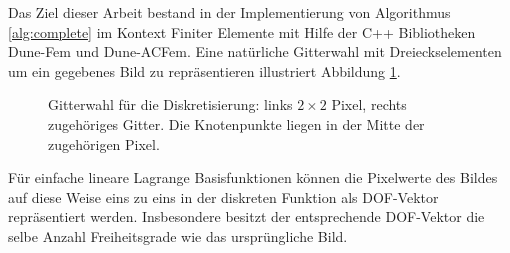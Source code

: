 \documentclass{mythesis}
\begin{document}
Das Ziel dieser Arbeit bestand in der Implementierung von Algorithmus \ref{alg:complete} im Kontext Finiter Elemente mit Hilfe der C++ Bibliotheken Dune-Fem und Dune-ACFem.
Eine natürliche Gitterwahl mit Dreieckselementen um ein gegebenes Bild zu repräsentieren illustriert Abbildung \ref{fig:grid}.
\begin{figure}[ht]
    \begin{subfigure}{0.5\textwidth}
	\centering
    \end{subfigure}%
    \begin{subfigure}{0.5\textwidth}
	\centering
    \end{subfigure}
    \caption{Gitterwahl für die Diskretisierung: links $2\times 2$ Pixel, rechts zugehöriges Gitter. Die Knotenpunkte liegen in der Mitte der zugehörigen Pixel.}
    \label{fig:grid}
\end{figure}
Für einfache lineare Lagrange Basisfunktionen können die Pixelwerte des Bildes auf diese Weise eins zu eins in der diskreten Funktion als DOF-Vektor repräsentiert werden.
Insbesondere besitzt der entsprechende DOF-Vektor die selbe Anzahl Freiheitsgrade wie das ursprüngliche Bild.
\end{document}

